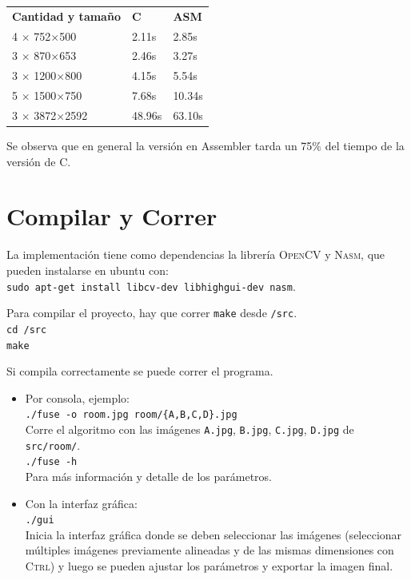 \documentclass[a4paper,10pt]{article}
\begin{document}
        \bigskip
        \begin{tabular}{lll}
        \textbf{Cantidad y tamaño} & \textbf{C} & \textbf{ASM}\\
        4 $\times$ 752$\times$500 & 2.11s & 2.85s\\
        3 $\times$ 870$\times$653 & 2.46s & 3.27s\\
        3 $\times$ 1200$\times$800 & 4.15s & 5.54s\\
        5 $\times$ 1500$\times$750 & 7.68s & 10.34s\\
        3 $\times$ 3872$\times$2592 & 48.96s & 63.10s\\
        \end{tabular}
        \bigskip
        
        Se observa que en general la versión en Assembler tarda un 75\% del tiempo de la versión de C.

    \newpage
    \section{Compilar y Correr}
    
        La implementación tiene como dependencias la librería \textsc{OpenCV} y \textsc{Nasm}, que pueden instalarse en ubuntu con:\\
        \texttt{sudo apt-get install libcv-dev libhighgui-dev nasm}.
        
        Para compilar el proyecto, hay que correr \texttt{make} desde \texttt{/src}.\\
        \texttt{cd /src}\\
        \texttt{make}
        
        Si compila correctamente se puede correr el programa.
        \begin{itemize}
        \item Por consola, ejemplo:\\
          \texttt{./fuse -o room.jpg room/\{A,B,C,D\}.jpg}\\
          Corre el algoritmo con las imágenes \texttt{A.jpg}, \texttt{B.jpg}, \texttt{C.jpg}, \texttt{D.jpg} de \texttt{src/room/}.\\
          \texttt{./fuse -h}\\
          Para más información y detalle de los parámetros.
        \item Con la interfaz gráfica:\\
          \texttt{./gui}\\
          Inicia la interfaz gráfica donde se deben seleccionar las imágenes (seleccionar múltiples imágenes previamente alineadas y de las mismas dimensiones con \textsc{Ctrl}) y luego se pueden ajustar los parámetros y exportar la imagen final.
        \end{itemize}
        
\end{document}

